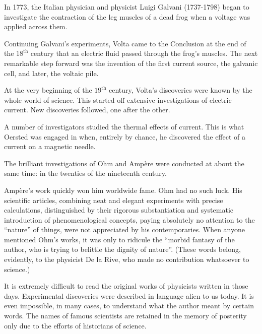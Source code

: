 In 1773, the Italian physician and physicist Luigi Galvani (1737-1798) began to investigate the contraction of the leg muscles of a dead frog when a voltage was applied across them.

Continuing Galvani's experiments, Volta came to the Conclusion at the end of the $18^{\textrm{th}}$ century that an electric fluid passed through the frog's muscles. The next remarkable step forward was the invention of the first current source, the galvanic cell, and later, the voltaic pile.

At the very beginning of the $19^{\textrm{th}}$ century, Volta's discoveries were known by the whole world of science. This started off extensive investigations of electric current. New discoveries followed, one after the other.

A number of investigators studied the thermal effects of current. This is what Oersted was engaged in when, entirely by chance, he discovered the effect of a current on a magnetic needle.

The brilliant investigations of Ohm and Amp\`ere were conducted at about the same time: in the twenties of the nineteenth century.

Amp\`ere's work quickly won him worldwide fame. Ohm had no such luck. His scientific articles, combining neat and elegant experiments with precise calculations, distinguished by their rigorous substantiation and systematic introduction of phenomenological concepts, paying absolutely no attention to the ``nature'' of things, were not appreciated by his contemporaries. When anyone mentioned Ohm's works, it was only to ridicule the ``morbid fantasy of the author, who is trying to belittle the dignity of nature''. (These words belong, evidently, to the physicist De la Rive, who made no contribution whatsoever to science.)

It is extremely difficult to read the original works of physicists written in those days. Experimental discoveries were described in language alien to us today. It is even impossible, in many cases, to understand what the author meant by certain words. The names of famous scientists are retained in the memory of posterity only due to the efforts of historians of science.





